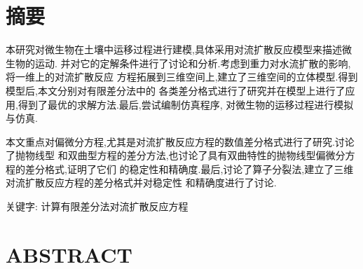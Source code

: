 
\chapter*{摘\qquad 要}
本研究对微生物在土壤中运移过程进行建模,具体采用对流扩散反应模型来描述微生物的运动.
并对它的定解条件进行了讨论和分析.考虑到重力对水流扩散的影响,将一维上的对流扩散反应
方程拓展到三维空间上,建立了三维空间的立体模型.得到模型后,本文分别对有限差分法中的
各类差分格式进行了研究并在模型上进行了应用,得到了最优的求解方法.最后,尝试编制仿真程序,
对微生物的运移过程进行模拟与仿真.\par
本文重点对偏微分方程,尤其是对流扩散反应方程的数值差分格式进行了研究.讨论了抛物线型
和双曲型方程的差分方法,也讨论了具有双曲特性的抛物线型偏微分方程的差分格式,证明了它们
的稳定性和精确度.最后,讨论了算子分裂法,建立了三维对流扩散反应方程的差分格式并对稳定性
和精确度进行了讨论.\par
\vspace*{\baselineskip}
{\heiti 关键字: 计算\quad 有限差分法\quad 对流扩散反应方程}
\clearpage{\pagestyle{empty}\cleardoublepage}
\chapter*{ABSTRACT}


